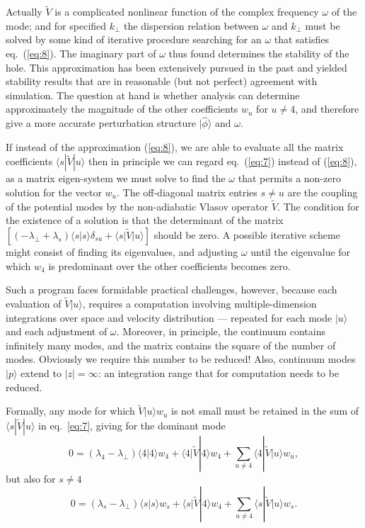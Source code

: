 \documentclass[12pt]{article}
\def\ket#1{|#1\rangle}
\def\bra#1{\langle#1}
\begin{document}
Actually $\tilde{V}$ is a complicated nonlinear function of the complex
frequency $\omega$ of the mode; and for specified $k_\perp$ the
dispersion relation between $\omega$ and $k_\perp$ must be solved by
some kind of iterative procedure searching for an $\omega$ that
satisfies eq.\ (\ref{eq:8}). The imaginary part of $\omega$ thus found
determines the stability of the hole. This approximation has been
extensively pursued in the past and yielded stability results
that are in reasonable (but not perfect) agreement with simulation.
The question at hand is whether analysis can determine approximately
the magnitude of the other coefficients $w_u$ for $u\not=4$, and
therefore give a more accurate perturbation structure $\ket{\hat\phi}$
and $\omega$.

If instead of the approximation (\ref{eq:8}), we are able to evaluate all the
matrix coefficients $\bra{s}|\tilde{V}\ket{u}$ then in principle we can regard eq.\
(\ref{eq:7}) instead of (\ref{eq:8}), as a matrix eigen-system we must
solve to find the $\omega$ that permits a non-zero solution for the
vector $w_u$. The off-diagonal matrix entries $s\not=u$ are the
coupling of the potential modes by the non-adiabatic Vlasov operator
$\tilde{V}$.  The condition for the existence of a solution is that the
determinant of the matrix
$[(-\lambda_\perp+\lambda_s)\bra{s}\ket{s}\delta_{su}+\bra{s}|\tilde{V}\ket{u}]$ should
be zero. A possible iterative scheme might consist of finding its
eigenvalues, and adjusting $\omega$ until the eigenvalue for which
$w_4$ is predominant over the other coefficients becomes zero.

Such a program faces formidable practical challenges, however, because
each evaluation of $\tilde{V}\ket{u}$, requires a computation involving
multiple-dimension integrations over space and velocity distribution
--- repeated for each mode $\ket{u}$ and each adjustment of $\omega$.
Moreover, in principle, the continuum contains infinitely many modes,
and the matrix contains the square of the number of modes.  Obviously
we require this number to be reduced! Also, continuum modes $\ket{p}$
extend to $|z|=\infty$: an integration range that for computation
needs to be reduced.

Formally, any mode for which $\tilde{V}\ket{u}w_u$ is not small
must be retained in the sum of $\bra{s}|\tilde{V}\ket{u}$ in eq.\
\ref{eq:7}, giving for the dominant mode
\begin{equation}
  \label{eq:9}
  0=(\lambda_4-\lambda_\perp)\bra{4}\ket{4}w_4+\bra{4}|\tilde{V}\ket{4}w_4+\sum_{u\not=4}\bra{4}|\tilde{V}\ket{u}w_u,
\end{equation}
but also for $s\not=4$
\begin{equation}
  \label{eq:10}
 0=(\lambda_s-\lambda_\perp)\bra{s}\ket{s}w_s+\bra{s}|\tilde{V}\ket{4}w_4+\sum_{u\not=4}\bra{s}|\tilde{V}\ket{u}w_s.
\end{equation}
\end{document}
